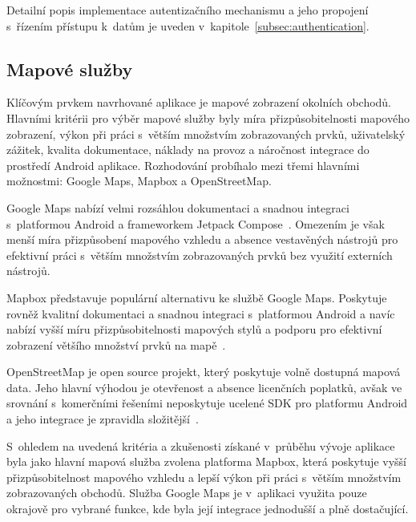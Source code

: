 Detailní popis implementace autentizačního mechanismu a jeho propojení s~řízením přístupu k~datům je uveden v~kapitole~\ref{subsec:authentication}.

\subsection{Mapové služby}
Klíčovým prvkem navrhované aplikace je mapové zobrazení okolních obchodů.
Hlavními kritérii pro výběr mapové služby byly míra přizpůsobitelnosti mapového zobrazení, výkon při práci s~větším množstvím zobrazovaných prvků, uživatelský zážitek, kvalita dokumentace, náklady na provoz a náročnost integrace do prostředí Android aplikace.
Rozhodování probíhalo mezi třemi hlavními možnostmi: Google Maps, Mapbox a OpenStreetMap.

Google Maps nabízí velmi rozsáhlou dokumentaci a snadnou integraci s~platformou Android a frameworkem Jetpack Compose~\parencite{google_maps_integration}.
Omezením je však menší míra přizpůsobení mapového vzhledu a absence vestavěných nástrojů pro efektivní práci s~větším množstvím zobrazovaných prvků bez využití externích nástrojů.

Mapbox představuje populární alternativu ke službě Google Maps.
Poskytuje rovněž kvalitní dokumentaci a snadnou integraci s~platformou Android a navíc nabízí vyšší míru přizpůsobitelnosti mapových stylů a podporu pro efektivní zobrazení většího množství prvků na mapě~\parencite{mapbox_docs}.

OpenStreetMap je open source projekt, který poskytuje volně dostupná mapová data.
Jeho hlavní výhodou je otevřenost a absence licenčních poplatků, avšak ve srovnání s~komerčními řešeními neposkytuje ucelené SDK pro platformu Android a jeho integrace je zpravidla složitější~\parencite{openstreetmap_about}.

S~ohledem na uvedená kritéria a zkušenosti získané v~průběhu vývoje aplikace byla jako hlavní mapová služba zvolena platforma Mapbox, která poskytuje vyšší přizpůsobitelnost mapového vzhledu a lepší výkon při práci s~větším množstvím zobrazovaných obchodů.
Služba Google Maps je v~aplikaci využita pouze okrajově pro vybrané funkce, kde byla její integrace jednodušší a plně dostačující.
